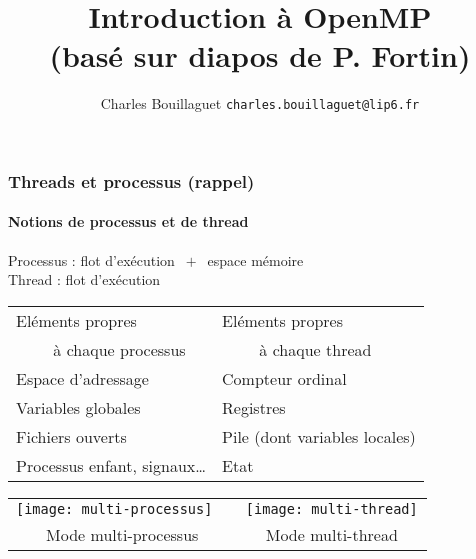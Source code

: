 \documentclass{beamer}
\author[C.~Bouillaguet]{Charles Bouillaguet \newline
  {\small \texttt{charles.bouillaguet@lip6.fr}}}
\title{Introduction à OpenMP \\ \vspace{1cm} (basé sur diapos de P. Fortin)}
\begin{document}
\begin{frame}
  \titlepage
\end{frame}
  

\begin{frame}
  \frametitle{Threads et processus (rappel)}
  \framesubtitle{Notions de processus et de thread}
  
  Processus : \og flot d'exécution \fg $~+~$ \og espace
  mémoire \fg \\
  Thread : \og flot d'exécution \fg 
  
  \bigskip

  \begin{tabularx}{\textwidth}{X|X}
    Eléments propres & Eléments propres \\
    $\qquad$ à chaque processus & $\qquad$ à chaque thread \\ 
    \hline
    Espace d'adressage & Compteur ordinal \\ 
    Variables globales & Registres \\
    Fichiers ouverts & Pile (dont variables locales)\\
    Processus enfant, signaux\dots & Etat \\
  \end{tabularx}
  
  \bigskip

  \begin{tabularx}{\textwidth}{c|c}
    \texttt{[image: multi-processus]}$\quad$&
    \texttt{[image: multi-thread]}\\
    
    Mode multi-processus    &
    $\quad$ Mode multi-thread $\quad$ \\
    
  \end{tabularx}
\end{frame}
\end{document}
